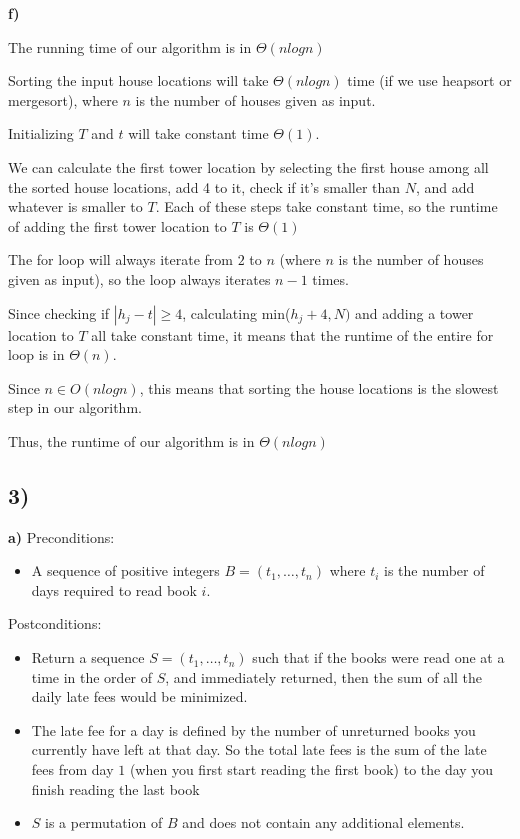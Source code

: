 \documentclass{article}
\begin{document}
\textbf{f)} 

The running time of our algorithm is in $\Theta(n log n)$

Sorting the input house locations will take $\Theta(nlogn)$ time (if we use heapsort or mergesort), where $n$ is the number of houses given as input.

Initializing $T$ and $t$ will take constant time $\Theta(1)$.

We can calculate the first tower location by selecting the first house among all the sorted house locations, add 4 to it, check if it's smaller than $N$, and add whatever is smaller to $T$. Each of these steps take constant time, so the runtime of adding the first tower location to $T$ is $\Theta(1)$

The for loop will always iterate from $2$ to $n$ (where $n$ is the number of houses given as input), so the loop always iterates $n-1$ times.

Since checking if $|h_j - t| \geq 4$, calculating min(${h_j+4}, N)$ and adding a tower location to $T$ all take constant time, it means that the runtime of the entire for loop is in $\Theta(n)$.

Since $n \in O(nlogn)$, this means that sorting the house locations is the slowest step in our algorithm.

Thus, the runtime of our algorithm is in $\Theta(nlogn)$


\subsection*{3)}

\textbf{a)} 
Preconditions:
\begin{itemize}
    \item A sequence of positive integers $B = (t_1, \dotsc, t_n)$ where $t_i$ is the number of days required to read book $i$. 
\end{itemize}

Postconditions: 
\begin{itemize}
\item Return a sequence $S = (t_1, \dotsc, t_n)$ such that if the books were read one at a time in the order of $S$, and immediately returned, then the sum of all the daily late fees would be minimized.
\item The late fee for a day is defined by the number of unreturned books you currently have left at that day. So the total late fees is the sum of the late fees from day $1$ (when you first start reading the first book) to the day you finish reading the last book
\item $S$ is a permutation of $B$ and does not contain any additional elements.
\end{itemize}
\end{document}
